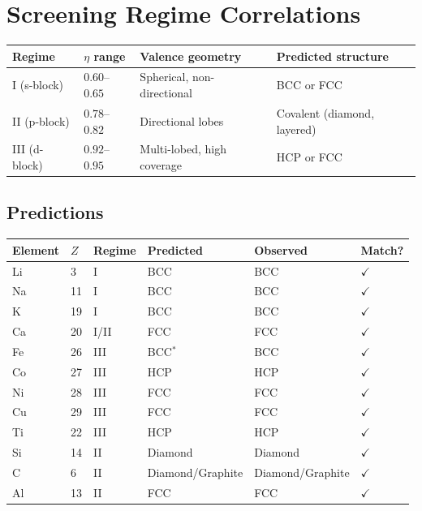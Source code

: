 \documentclass[12pt,a4paper]{report}
\begin{document}
\section{Screening Regime Correlations}

\begin{center}
\begin{tabular}{llll}
\toprule
\textbf{Regime} & \textbf{$\eta$ range} & \textbf{Valence geometry} & \textbf{Predicted structure} \\
\midrule
I (s-block)  & $0.60$--$0.65$ & Spherical, non-directional & BCC or FCC \\
II (p-block) & $0.78$--$0.82$ & Directional lobes & Covalent (diamond, layered) \\
III (d-block) & $0.92$--$0.95$ & Multi-lobed, high coverage & HCP or FCC \\
\bottomrule
\end{tabular}
\end{center}

\subsection{Predictions}

\begin{center}
\small
\begin{tabular}{llllll}
\toprule
\textbf{Element} & $Z$ & \textbf{Regime} & \textbf{Predicted} & \textbf{Observed} & \textbf{Match?} \\
\midrule
Li &  3 & I  & BCC & BCC & $\checkmark$ \\
Na & 11 & I  & BCC & BCC & $\checkmark$ \\
K  & 19 & I  & BCC & BCC & $\checkmark$ \\
Ca & 20 & I/II & FCC & FCC & $\checkmark$ \\
Fe & 26 & III & BCC$^*$ & BCC & $\checkmark$ \\
Co & 27 & III & HCP & HCP & $\checkmark$ \\
Ni & 28 & III & FCC & FCC & $\checkmark$ \\
Cu & 29 & III & FCC & FCC & $\checkmark$ \\
Ti & 22 & III & HCP & HCP & $\checkmark$ \\
Si & 14 & II  & Diamond & Diamond & $\checkmark$ \\
C  &  6 & II  & Diamond/Graphite & Diamond/Graphite & $\checkmark$ \\
Al & 13 & II  & FCC & FCC & $\checkmark$ \\
\bottomrule
\end{tabular}
\end{center}
\end{document}
